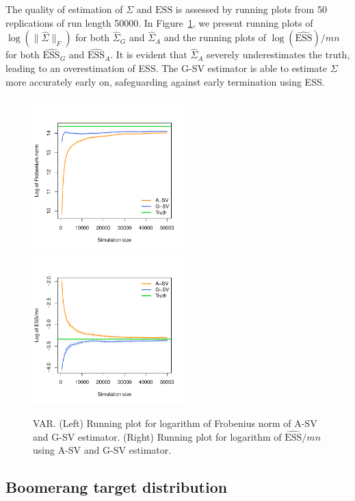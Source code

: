 \documentclass[12pt]{article}
\theoremstyle{remark}
\begin{document}
The quality of estimation of $\Sigma$ and $\text{ESS}$ is assessed by running plots from 50 replications of run length 50000. 
 In Figure~\ref{fig:var-frob_n_ess}, we present running plots of $\log(\|\hat{\Sigma}\|_F)$ for both $\hat{\Sigma}_G$ and $\hat{\Sigma}_A$ and the running plots of $\log(\widehat{\text{ESS}})/mn$ for both  $\widehat{\text{ESS}}_G$ and $\widehat{\text{ESS}}_A$. It is evident that $\hat{\Sigma}_A$ severely underestimates the truth, leading to an overestimation of ESS. The G-SV estimator is able to estimate $\Sigma$ more accurately early on, safeguarding against early termination using ESS. 

\begin{figure}[htbp]
    \centering
      \includegraphics[width = 2.3in]{plots/var-frob.pdf} 
      \includegraphics[width = 2.3in]{plots/var-ess.pdf}         
    \caption{VAR. (Left) Running plot for logarithm of Frobenius norm of A-SV and G-SV estimator. (Right) Running plot for logarithm of $\widehat{\textrm{ESS}}/mn$ using A-SV and G-SV estimator.}
    \label{fig:var-frob_n_ess}
\end{figure}






\subsection{Boomerang target distribution} \label{ex:boomerang}
\end{document}
